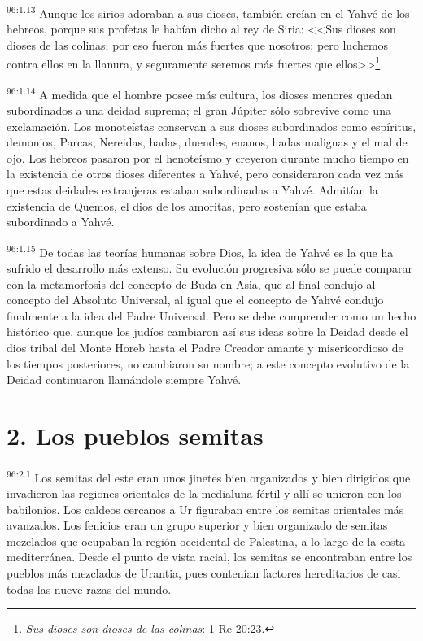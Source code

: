 \par
\textsuperscript{96:1.13} Aunque los sirios adoraban a sus dioses, también creían en el Yahvé de los hebreos, porque sus profetas le habían dicho al rey de Siria: <<Sus dioses son dioses de las colinas; por eso fueron más fuertes que nosotros; pero luchemos contra ellos en la llanura, y seguramente seremos más fuertes que ellos>>\footnote{\textit{Sus dioses son dioses de las colinas}: 1 Re 20:23.}.

\par
\textsuperscript{96:1.14} A medida que el hombre posee más cultura, los dioses menores quedan subordinados a una deidad suprema; el gran Júpiter sólo sobrevive como una exclamación. Los monoteístas conservan a sus dioses subordinados como espíritus, demonios, Parcas, Nereidas, hadas, duendes, enanos, hadas malignas y el mal de ojo. Los hebreos pasaron por el henoteísmo y creyeron durante mucho tiempo en la existencia de otros dioses diferentes a Yahvé, pero consideraron cada vez más que estas deidades extranjeras estaban subordinadas a Yahvé. Admitían la existencia de Quemos, el dios de los amoritas, pero sostenían que estaba subordinado a Yahvé.

\par
\textsuperscript{96:1.15} De todas las teorías humanas sobre Dios, la idea de Yahvé es la que ha sufrido el desarrollo más extenso. Su evolución progresiva sólo se puede comparar con la metamorfosis del concepto de Buda en Asia, que al final condujo al concepto del Absoluto Universal, al igual que el concepto de Yahvé condujo finalmente a la idea del Padre Universal. Pero se debe comprender como un hecho histórico que, aunque los judíos cambiaron así sus ideas sobre la Deidad desde el dios tribal del Monte Horeb hasta el Padre Creador amante y misericordioso de los tiempos posteriores, no cambiaron su nombre; a este concepto evolutivo de la Deidad continuaron llamándole siempre Yahvé.

\section*{2. Los pueblos semitas}
\par
\textsuperscript{96:2.1} Los semitas del este eran unos jinetes bien organizados y bien dirigidos que invadieron las regiones orientales de la medialuna fértil y allí se unieron con los babilonios. Los caldeos cercanos a Ur figuraban entre los semitas orientales más avanzados. Los fenicios eran un grupo superior y bien organizado de semitas mezclados que ocupaban la región occidental de Palestina, a lo largo de la costa mediterránea. Desde el punto de vista racial, los semitas se encontraban entre los pueblos más mezclados de Urantia, pues contenían factores hereditarios de casi todas las nueve razas del mundo.

